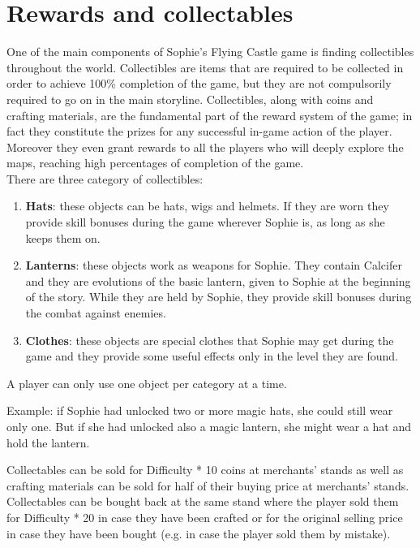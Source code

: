 \section{Rewards and collectables}
One of the main components of Sophie's Flying Castle game is finding collectibles throughout the world.
Collectibles are items that are required to be collected in order to achieve 100\%
completion of the game, but they are not compulsorily required to go on in the main storyline. Collectibles, along with coins and crafting materials, are the fundamental part of the reward system of the game; in fact they constitute the prizes for any successful in-game action of the player. Moreover they even grant rewards to all the players who will deeply explore the maps, reaching high percentages of completion of the game.\\

There are three category of collectibles:
\begin{enumerate}
\item \textbf{Hats}: these objects can be hats, wigs and helmets. If they are worn they provide skill bonuses during the game wherever Sophie is, as long as she keeps them on.
\item \textbf{Lanterns}: these objects work as weapons for Sophie. They contain Calcifer and they are evolutions of the basic lantern, given to Sophie at the beginning of the story. While they are held by Sophie, they provide skill bonuses during the combat against enemies. 
\item \textbf{Clothes}: these objects are special clothes that Sophie may get during the game and they provide some useful effects only in the level they are found. %
  \end{enumerate}

A player can only use one object per category at a time.

Example: if Sophie had unlocked two or more magic hats, she could still wear only one. But if she had unlocked also a magic lantern, she might wear a hat and hold the lantern.

Collectables can be sold for Difficulty * 10 coins at merchants' stands as well as crafting materials can be sold for half of their buying price at merchants' stands. Collectables can be bought back at the same stand where the player sold them for Difficulty * 20 in case they have been crafted or for the original selling price in case they have been bought (e.g. in case the player sold them by mistake).



